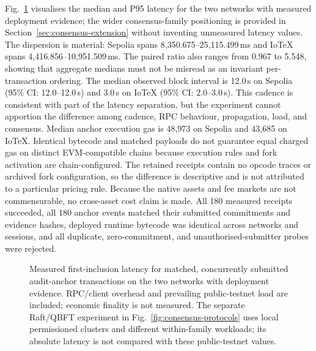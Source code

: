 \documentclass[journal]{IEEEtran}
\begin{document}
Fig.~\ref{fig:paired-latency} visualises the median and P95 latency for the
two networks with measured deployment evidence; the wider consensus-family
positioning is provided in Section~\ref{sec:consensus-extension} without
inventing unmeasured latency values. The dispersion is material: Sepolia spans
8{,}350.675--25{,}115.499\,ms and IoTeX spans 4{,}416.856--10{,}951.509\,ms.
The paired ratio also ranges from 0.967 to 5.548, showing that aggregate
medians must not be misread as an invariant per-transaction ordering. The
median observed block interval is 12.0\,s on Sepolia (95\% CI: 12.0--12.0\,s)
and 3.0\,s on IoTeX (95\% CI: 2.0--3.0\,s). This cadence is consistent with
part of the latency separation, but the experiment cannot apportion the
difference among cadence, RPC behaviour, propagation, load, and consensus.
Median anchor execution gas is 48{,}973 on Sepolia and 43{,}685 on IoTeX.
Identical bytecode and matched payloads do not guarantee equal charged gas on
distinct EVM-compatible chains because execution rules and fork activation are
chain-configured. The retained receipts contain no opcode traces or archived
fork configuration, so the difference is descriptive and is not attributed to
a particular pricing rule. Because the native assets and fee markets are not
commensurable, no cross-asset cost claim is made. All 180 measured receipts
succeeded, all 180
anchor events matched their submitted commitments and evidence hashes,
deployed runtime bytecode was identical across networks and sessions, and all
duplicate, zero-commitment, and unauthorised-submitter probes were rejected.
\begin{figure}[!t]
\centering
{}
\caption{Measured first-inclusion latency for matched, concurrently submitted
audit-anchor transactions on the two networks with deployment evidence.
RPC/client overhead and prevailing public-testnet load are included; economic
finality is not measured. The separate Raft/QBFT experiment in
Fig.~\ref{fig:consensus-protocols} uses local permissioned clusters and
different within-family workloads; its absolute latency is not compared with
these public-testnet values.}
\label{fig:paired-latency}
\end{figure}
\end{document}
